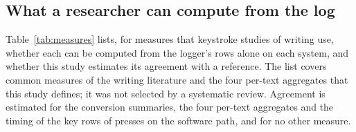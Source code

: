 \subsection{What a researcher can compute from the log}
\label{sec:logger-measures}

Table~\ref{tab:measures} lists, for measures that keystroke studies of writing use, whether each can be computed from
the logger's rows alone on each system, and whether this study estimates its agreement with a reference. The list
covers common measures of the writing literature and the four per-text aggregates that this study defines; it was not
selected by a systematic review. Agreement is estimated for the conversion summaries, the four per-text aggregates
and the timing of the key rows of presses on the software path, and for no other measure.

